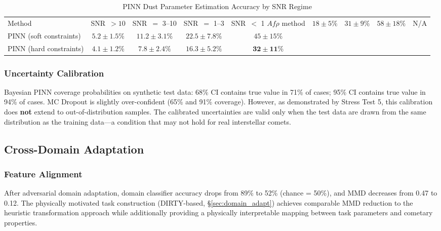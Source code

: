 \documentclass[usenatbib]{mnras}
\begin{document}
\begin{table}
\centering
\caption{PINN Dust Parameter Estimation Accuracy by SNR Regime}\label{tab:pin_perf}
\begin{tabular}{lcccc}
\toprule
Method & SNR~$>10$ & SNR~$=$ 3--10 & SNR~$=$ 1--3 & SNR~$<$ 1
\midrule
$Af\rho$ method & $18 \pm 5\%$ & $31 \pm 9\%$ & $58 \pm 18\%$ & N/A \\
PINN (soft constraints) & $5.2 \pm 1.5\%$ & $11.2 \pm 3.1\%$ & $22.5 \pm 7.8\%$ & $45 \pm 15\%$ \\
PINN (hard constraints) & $\mathbf{4.1 \pm 1.2\%}$ & $\mathbf{7.8 \pm 2.4\%}$ & $\mathbf{16.3 \pm 5.2\%}$ & $\mathbf{32 \pm 11\%}$ \\
\bottomrule
\end{tabular}
\end{table}


\subsubsection{Uncertainty Calibration}

Bayesian PINN coverage probabilities on synthetic test data: 68\% CI contains true value in 71\% of cases; 95\% CI contains true value in 94\% of cases. MC Dropout is slightly over-confident (65\% and 91\% coverage). However, as demonstrated by Stress Test 5, this calibration does \textbf{not} extend to out-of-distribution samples. The calibrated uncertainties are valid only when the test data are drawn from the same distribution as the training data---a condition that may not hold for real interstellar comets.

\subsection{Cross-Domain Adaptation}

\subsubsection{Feature Alignment}

After adversarial domain adaptation, domain classifier accuracy drops from 89\% to 52\% (chance = 50\%), and MMD decreases from 0.47 to 0.12. The physically motivated task construction (DIRTY-based, \S\ref{sec:domain_adapt}) achieves comparable MMD reduction to the heuristic transformation approach while additionally providing a physically interpretable mapping between task parameters and cometary properties.
\end{document}
